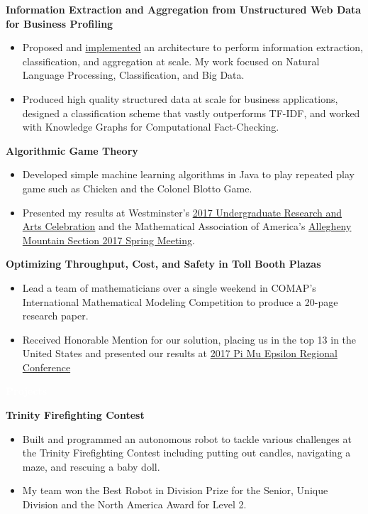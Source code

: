 \documentclass[letterpaper,11pt]{article}
\newcommand{\resitem}[1]{\item #1 \vspace{-2pt}}
\newcommand{\resheading}[1]{{\large \colorbox{mypurple}{\begin{minipage}{\textwidth}{\textbf{#1 \vphantom{p\^{E}}}}\end{minipage}}}}
\begin{document}
		\textbf{Information Extraction and Aggregation from Unstructured Web Data for Business Profiling}
		\begin{itemize}
			\resitem{Proposed and \href{https://github.com/himahuja/pcatxcore}{implemented} an architecture to perform information extraction, classification, and aggregation at scale. My work focused on Natural Language Processing, Classification, and Big Data.}
			\resitem{Produced high quality structured data at scale for business applications, designed a classification scheme that vastly outperforms TF-IDF, and worked with Knowledge Graphs for Computational Fact-Checking.}
		\end{itemize}

		\textbf{Algorithmic Game Theory}
		\begin{itemize}
			\resitem{Developed simple machine learning algorithms in Java to play repeated play game such as Chicken and the Colonel Blotto Game.}
			\resitem{Presented my results at Westminster's \href{https://alexandermichels.github.io/docs/2017-urac-schedule.pdf}{2017 Undergraduate Research and Arts Celebration} and the Mathematical Association of America's \href{https://alexandermichels.github.io/docs/MAA2017Abstracts.pdf}{Allegheny Mountain Section 2017 Spring Meeting}.}
		\end{itemize}
	
		\textbf{Optimizing Throughput, Cost, and Safety in Toll Booth Plazas}
		\begin{itemize}
			\resitem{Lead a team of mathematicians over a single weekend in COMAP's International Mathematical Modeling Competition to produce a 20-page research paper.}
			\resitem{Received Honorable Mention for our solution, placing us in the top 13 in the United States and presented our results at \href{https://alexandermichels.github.io/docs/PME2017Program.pdf}{2017 Pi Mu Epsilon Regional Conference}}
		\end{itemize}
	
	\resheading{\textcolor{white}{Projects}}
	
			\vspace{0.1in}
	
	\textbf{Trinity Firefighting Contest}
	\begin{itemize}
		\resitem{Built and programmed an autonomous robot to tackle various challenges at the Trinity Firefighting Contest including putting out candles, navigating a maze, and rescuing a baby doll.}
		\resitem{My team won the Best Robot in Division Prize for the Senior, Unique Division and the North America Award for Level 2.}
	\end{itemize}
	
\end{document}
